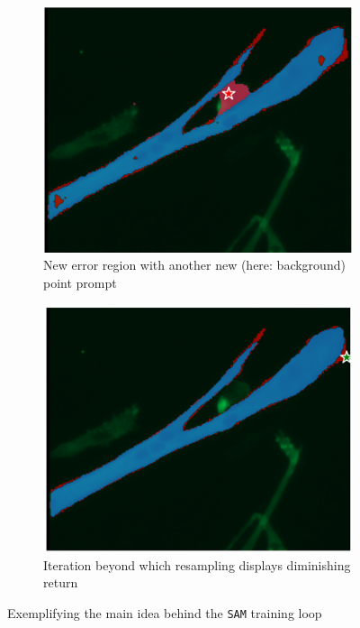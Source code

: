 \begin{figure}
	\medskip
	
	\begin{subfigure}{0.45\textwidth}
		\centering
		\includegraphics[width=\linewidth]{images/training3}
		\caption{New error region with another new (here: background) point prompt}
		\label{figtrain3}
	\end{subfigure}
	\hfill
	\begin{subfigure}{0.45\textwidth}
		\centering
		\includegraphics[width=\linewidth]{images/training4}
		\caption{Iteration beyond which resampling displays diminishing return}
		\label{figtrain4}
	\end{subfigure}
	\caption[\texttt{SAM} training loop]{Exemplifying the main idea behind the \texttt{SAM} training loop}
	\label{figtrain}
\end{figure}

